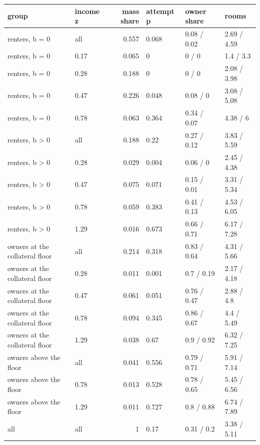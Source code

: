 \begingroup\small
\setlength{\tabcolsep}{3pt}
\renewcommand{\arraystretch}{1.04}
\begin{tabularx}{\linewidth}{XXrXXX}
\toprule
group & income z & mass share & attempt p & owner share & rooms \\
\midrule
renters, b = 0 & all & 0.557 & 0.068 & 0.08 / 0.02 & 2.69 / 4.59 \\
renters, b = 0 & 0.17 & 0.065 & 0 & 0 / 0 & 1.4 / 3.3 \\
renters, b = 0 & 0.28 & 0.188 & 0 & 0 / 0 & 2.08 / 3.98 \\
renters, b = 0 & 0.47 & 0.226 & 0.048 & 0.08 / 0 & 3.08 / 5.08 \\
renters, b = 0 & 0.78 & 0.063 & 0.364 & 0.34 / 0.07 & 4.38 / 6 \\
renters, b \textgreater{} 0 & all & 0.188 & 0.22 & 0.27 / 0.12 & 3.83 / 5.59 \\
renters, b \textgreater{} 0 & 0.28 & 0.029 & 0.004 & 0.06 / 0 & 2.45 / 4.38 \\
renters, b \textgreater{} 0 & 0.47 & 0.075 & 0.071 & 0.15 / 0.01 & 3.31 / 5.34 \\
renters, b \textgreater{} 0 & 0.78 & 0.059 & 0.383 & 0.41 / 0.13 & 4.53 / 6.05 \\
renters, b \textgreater{} 0 & 1.29 & 0.016 & 0.673 & 0.66 / 0.71 & 6.17 / 7.28 \\
owners at the collateral floor & all & 0.214 & 0.318 & 0.83 / 0.64 & 4.31 / 5.66 \\
owners at the collateral floor & 0.28 & 0.011 & 0.001 & 0.7 / 0.19 & 2.17 / 4.18 \\
owners at the collateral floor & 0.47 & 0.061 & 0.051 & 0.76 / 0.47 & 2.88 / 4.8 \\
owners at the collateral floor & 0.78 & 0.094 & 0.345 & 0.86 / 0.67 & 4.4 / 5.49 \\
owners at the collateral floor & 1.29 & 0.038 & 0.67 & 0.9 / 0.92 & 6.32 / 7.25 \\
owners above the floor & all & 0.041 & 0.556 & 0.79 / 0.71 & 5.91 / 7.14 \\
owners above the floor & 0.78 & 0.013 & 0.528 & 0.78 / 0.65 & 5.45 / 6.56 \\
owners above the floor & 1.29 & 0.011 & 0.727 & 0.8 / 0.88 & 6.74 / 7.89 \\
all & all & 1 & 0.17 & 0.31 / 0.2 & 3.38 / 5.11 \\
\bottomrule
\end{tabularx}
\endgroup
